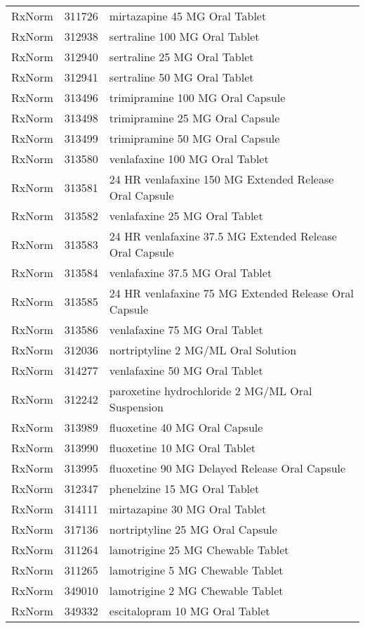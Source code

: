 \begin{longtable}{p{}p{}p{}}
  RxNorm & 311726 & mirtazapine 45 MG Oral Tablet \\ 
  RxNorm & 312938 & sertraline 100 MG Oral Tablet \\ 
  RxNorm & 312940 & sertraline 25 MG Oral Tablet \\ 
  RxNorm & 312941 & sertraline 50 MG Oral Tablet \\ 
  RxNorm & 313496 & trimipramine 100 MG Oral Capsule \\ 
  RxNorm & 313498 & trimipramine 25 MG Oral Capsule \\ 
  RxNorm & 313499 & trimipramine 50 MG Oral Capsule \\ 
  RxNorm & 313580 & venlafaxine 100 MG Oral Tablet \\ 
  RxNorm & 313581 & 24 HR venlafaxine 150 MG Extended Release Oral Capsule \\ 
  RxNorm & 313582 & venlafaxine 25 MG Oral Tablet \\ 
  RxNorm & 313583 & 24 HR venlafaxine 37.5 MG Extended Release Oral Capsule \\ 
  RxNorm & 313584 & venlafaxine 37.5 MG Oral Tablet \\ 
  RxNorm & 313585 & 24 HR venlafaxine 75 MG Extended Release Oral Capsule \\ 
  RxNorm & 313586 & venlafaxine 75 MG Oral Tablet \\ 
  RxNorm & 312036 & nortriptyline 2 MG/ML Oral Solution \\ 
  RxNorm & 314277 & venlafaxine 50 MG Oral Tablet \\ 
  RxNorm & 312242 & paroxetine hydrochloride 2 MG/ML Oral Suspension \\ 
  RxNorm & 313989 & fluoxetine 40 MG Oral Capsule \\ 
  RxNorm & 313990 & fluoxetine 10 MG Oral Tablet \\ 
  RxNorm & 313995 & fluoxetine 90 MG Delayed Release Oral Capsule \\ 
  RxNorm & 312347 & phenelzine 15 MG Oral Tablet \\ 
  RxNorm & 314111 & mirtazapine 30 MG Oral Tablet \\ 
  RxNorm & 317136 & nortriptyline 25 MG Oral Capsule \\ 
  RxNorm & 311264 & lamotrigine 25 MG Chewable Tablet \\ 
  RxNorm & 311265 & lamotrigine 5 MG Chewable Tablet \\ 
  RxNorm & 349010 & lamotrigine 2 MG Chewable Tablet \\ 
  RxNorm & 349332 & escitalopram 10 MG Oral Tablet \\ 

\end{longtable}
